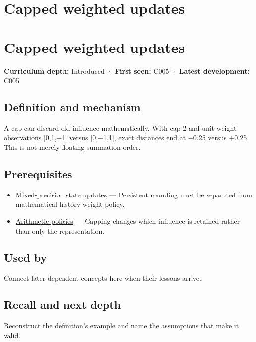 \hypertarget{appendix-1e45d0613db3}{}
\section*{Capped weighted updates}
\section{Capped weighted updates}\label{capped-weighted-updates}

\textbf{Curriculum depth:} Introduced · \textbf{First seen:} C005 · \textbf{Latest development:} C005

\subsection{Definition and mechanism}\label{definition-and-mechanism}

A cap can discard old influence mathematically. With cap 2 and unit-weight observations {[}0,1,−1{]} versus {[}0,−1,1{]}, exact distances end at −0.25 versus +0.25. This is not merely floating summation order.

\subsection{Prerequisites}\label{prerequisites}

\begin{itemize}
\tightlist
\item
  \hyperref[appendix-260182e617b7]{Mixed-precision state updates} --- Persistent rounding must be separated from mathematical history-weight policy.
\item
  \hyperref[appendix-2ed044358b82]{Arithmetic policies} --- Capping changes which influence is retained rather than only the representation.
\end{itemize}

\subsection{Used by}\label{used-by}

Connect later dependent concepts here when their lessons arrive.

\subsection{Recall and next depth}\label{recall-and-next-depth}

Reconstruct the definition's example and name the assumptions that make it valid.

